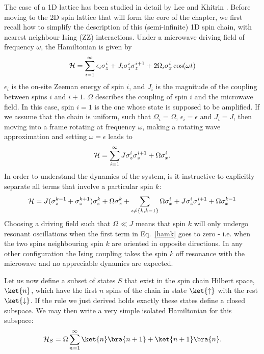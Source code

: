 The case of a 1D lattice has been studied in detail by Lee and Khitrin \cite{Lee:2005p6468}. Before moving to the 2D spin lattice that will form the core of the chapter, we first recall how to simplify the description of this (semi-infinite) 1D spin chain, with nearest neighbour Ising (ZZ) interactions. Under a microwave driving field of frequency $\omega$, the Hamiltonian is given by
\begin{equation} {\cal H} = \sum_{i=1}^{\infty} \epsilon_i \sigma^i_z
  + J_i \sigma_z^i\sigma_z^{i+1} + 2 \Omega_i \sigma_x^i \cos(\omega
  t)
\end{equation}
$\epsilon_i$ is the on-site Zeeman energy of spin $i$, and $J_i$ is the magnitude of the coupling between spins $i$ and $i+1$. $\Omega$ describes the coupling of spin $i$ and the microwave field. In this case, spin $i=1$ is the one whose state is supposed to be amplified. If we assume that the chain is uniform, such that $\Omega_i = \Omega$, $\epsilon_i = \epsilon$ and $J_i = J$, then moving into a frame rotating at frequency $\omega$, making a rotating wave approximation and setting $\omega = \epsilon$ leads to
\begin{equation} {\cal H} = \sum_{i=1}^{\infty} J
  \sigma_z^i\sigma_z^{i+1} + \Omega \sigma_x^i .
\end{equation}
In order to understand the dynamics of the system, is it instructive to explicitly separate all terms that involve a particular spin $k$:
\begin{equation} {\cal H} = J (\sigma_z^{k-1} +
  \sigma_z^{k+1})\sigma_z^k + \Omega \sigma^k_x + \sum_{i \neq \{k,
  k-1\}} \Omega\sigma_x^i + J \sigma_z^i\sigma_z^{i+1} +
  \Omega\sigma_x^{k-1}
  \label{hamk}
\end{equation}
Choosing a driving field such that $\Omega\ll J$ means that spin $k$ will only undergo resonant oscillations when the first term in Eq.~\ref{hamk} goes to zero - i.e. when the two spins neighbouring spin $k$ are oriented in opposite directions. In any other configuration the Ising coupling takes the spin $k$ off resonance with the microwave and no appreciable dynamics are expected.

Let us now define a subset of states $S$ that exist in the spin chain Hilbert space, $\ket{n}$, which have the first $n$ spins of the chain in state $\ket{\uparrow}$ with the rest $\ket{\downarrow}$. If the rule we just derived holds exactly these states define a closed subspace. We may then write a very simple isolated Hamiltonian for this subspace:
\begin{equation}
  {\cal H}_S = \Omega \sum_{n=1}^\infty \ket{n}\bra{ n+1}+\ket{n+1}\bra{ n}.
  \label{1d_ham}
\end{equation}

